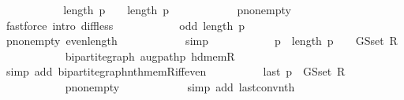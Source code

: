 \begin{isabellebody}
\ {\isacharminus}{\kern0pt}\isanewline
\ \ \ \ \ \ \ \ \isamarkupfalse%
\ {\isachardoublequoteopen}length\ p\ {\isacharminus}{\kern0pt}\ {}\ {\isacharless}{\kern0pt}\ length\ p{\isachardoublequoteclose}\isanewline
\ \ \ \ \ \ \ \ \ \ \isamarkupfalse%
\ p{\isacharunderscore}{\kern0pt}non{\isacharunderscore}{\kern0pt}empty\isanewline
\ \ \ \ \ \ \ \ \ \ \isamarkupfalse%
\ {\isacharparenleft}{\kern0pt}fastforce\ intro{\isacharcolon}{\kern0pt}\ diff{\isacharunderscore}{\kern0pt}less{\isacharparenright}{\kern0pt}\isanewline
\ \ \ \ \ \ \ \ \isamarkupfalse%
\ \isamarkupfalse%
\ {\isachardoublequoteopen}odd\ {\isacharparenleft}{\kern0pt}length\ p\ {\isacharminus}{\kern0pt}\ {}{\isacharparenright}{\kern0pt}{\isachardoublequoteclose}\isanewline
\ \ \ \ \ \ \ \ \ \ \isamarkupfalse%
\ p{\isacharunderscore}{\kern0pt}non{\isacharunderscore}{\kern0pt}empty\ even{\isacharunderscore}{\kern0pt}length\isanewline
\ \ \ \ \ \ \ \ \ \ \isamarkupfalse%
\ simp\isanewline
\ \ \ \ \ \ \ \ \isamarkupfalse%
\ \isamarkupfalse%
\ {\isachardoublequoteopen}p\ {\isacharbang}{\kern0pt}\ {\isacharparenleft}{\kern0pt}length\ p\ {\isacharminus}{\kern0pt}\ {}{\isacharparenright}{\kern0pt}\ {\isasymnotin}\ G{\isachardot}{\kern0pt}S{\isachardot}{\kern0pt}set\ R{\isachardoublequoteclose}\isanewline
\ \ \ \ \ \ \ \ \ \ \isamarkupfalse%
\ bipartite{\isacharunderscore}{\kern0pt}graph\ augpath{\isacharunderscore}{\kern0pt}p\ hd{\isacharunderscore}{\kern0pt}mem{\isacharunderscore}{\kern0pt}R\isanewline
\ \ \ \ \ \ \ \ \ \ \isamarkupfalse%
\ {\isacharparenleft}{\kern0pt}simp\ add{\isacharcolon}{\kern0pt}\ bipartite{\isacharunderscore}{\kern0pt}graph{\isachardot}{\kern0pt}nth{\isacharunderscore}{\kern0pt}mem{\isacharunderscore}{\kern0pt}R{\isacharunderscore}{\kern0pt}iff{\isacharunderscore}{\kern0pt}even{\isacharparenright}{\kern0pt}\isanewline
\ \ \ \ \ \ \ \ \isamarkupfalse%
\ {\isachardoublequoteopen}last\ p\ {\isasymnotin}\ G{\isachardot}{\kern0pt}S{\isachardot}{\kern0pt}set\ R{\isachardoublequoteclose}\isanewline
\ \ \ \ \ \ \ \ \ \ \isamarkupfalse%
\ p{\isacharunderscore}{\kern0pt}non{\isacharunderscore}{\kern0pt}empty\isanewline
\ \ \ \ \ \ \ \ \ \ \isamarkupfalse%
\ {\isacharparenleft}{\kern0pt}simp\ add{\isacharcolon}{\kern0pt}\ last{\isacharunderscore}{\kern0pt}conv{\isacharunderscore}{\kern0pt}nth{\isacharparenright}{\kern0pt}\isanewline

\end{isabellebody}
